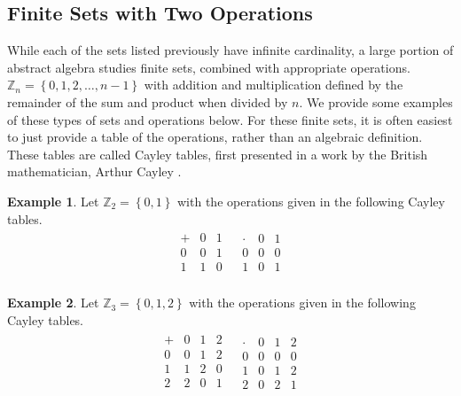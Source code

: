 \documentclass[
]{book}
\theoremstyle{definition}
\theoremstyle{definition}
\newtheorem{example}{Example}[chapter]
\theoremstyle{definition}
\theoremstyle{remark}
\begin{document}
\hypertarget{finite-sets-with-two-operations}{%
\subsection{Finite Sets with Two Operations}\label{finite-sets-with-two-operations}}

While each of the sets listed previously have infinite cardinality, a large portion of abstract algebra studies finite sets, combined with appropriate operations. \(\mathbb{Z}_n = \left\{0, 1, 2, \ldots, n-1\right\}\) with addition and multiplication defined by the remainder of the sum and product when divided by \(n\). We provide some examples of these types of sets and operations below. For these finite sets, it is often easiest to just provide a table of the operations, rather than an algebraic definition. These tables are called Cayley tables, first presented in a work by the British mathematician, Arthur Cayley \citeyearpar{Cayley}.

\begin{example}
\protect\hypertarget{exm:z2ring}{}{\label{exm:z2ring} }Let \(\mathbb{Z}_2=\left\{ 0,1 \right\}\) with the operations given in the following Cayley tables.
\[\begin{array}{cc}
\begin{array}{c|cc}
+ & 0 & 1 \\ \hline
0 & 0 & 1 \\
1 & 1 & 0 \\
\end{array}
&
\begin{array}{c|cc}
\cdot & 0 & 1 \\ \hline
0 & 0 & 0 \\
1 & 0 & 1 \\
\end{array}
\end{array}\]
\end{example}

\begin{example}
\protect\hypertarget{exm:z3ring}{}{\label{exm:z3ring} }Let \(\mathbb{Z}_3=\left\{ 0,1, 2 \right\}\) with the operations given in the following Cayley tables.
\[\begin{array}{cc}
\begin{array}{c|ccc}
+ & 0 & 1 & 2 \\ \hline
0 & 0 & 1 & 2\\
1 & 1 & 2 & 0 \\
2 & 2 & 0 & 1 \\
\end{array} &
\begin{array}{c|ccc}
\cdot & 0 & 1 & 2\\ \hline
0 & 0 & 0  & 0 \\
1 & 0 & 1 & 2 \\
2 & 0 & 2 & 1
\end{array} \\
\end{array}\]
\end{example}
\end{document}
